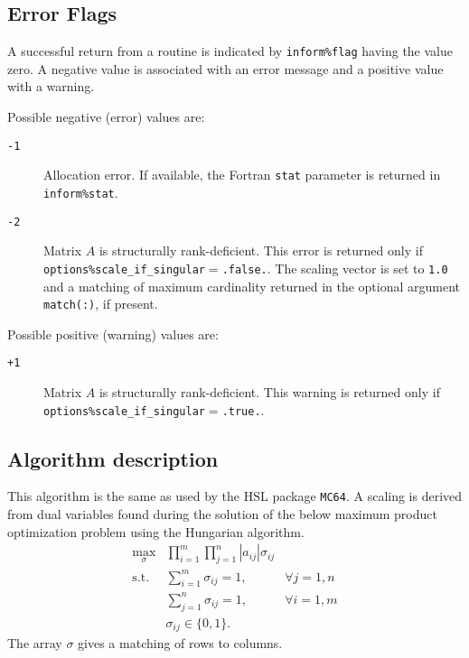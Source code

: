 \subsection{Error Flags} \label{scaling:errors:hungarian}
A successful return from a routine is indicated by \texttt{inform\%flag} having the value zero. A negative value is associated with an error message and a positive value with a warning.

Possible negative (error) values are:
\begin{description}
\item[\texttt{-1}] Allocation error. If available, the Fortran \texttt{stat} parameter is returned in \texttt{inform\%stat}.
\item[\texttt{-2}] Matrix $A$ is structurally rank-deficient. This error is
   returned only if
   \texttt{options\%scale\_if\_singular}$=$\texttt{.false.}. The scaling vector
   is set to \texttt{1.0} and a matching of maximum cardinality returned
   in the optional argument \texttt{match(:)}, if present.
\end{description}

Possible positive (warning) values are:
\begin{description}
\item[\texttt{+1}] Matrix $A$ is structurally rank-deficient. This warning is
   returned only if
   \texttt{options\%scale\_if\_singular}$=$\texttt{.true.}.
\end{description}

\subsection{Algorithm description}

This algorithm is the same as used by the HSL package \texttt{MC64}. A scaling
is derived from dual variables found during the solution of the below
maximum product optimization problem using the Hungarian algorithm.
\begin{eqnarray*}
   \max_{\sigma} & \prod_{i=1}^m\prod_{j=1}^n |a_{ij}|\sigma_{ij} & \\
   \mathrm{s.t.} & \sum_{i=1}^m\sigma_{ij} = 1, & \forall j=1,n \\
                 & \sum_{j=1}^n\sigma_{ij} = 1, & \forall i=1,m \\
                 & \sigma_{ij} \in \{0,1\}.
\end{eqnarray*}
The array $\sigma$ gives a matching of rows to columns.

